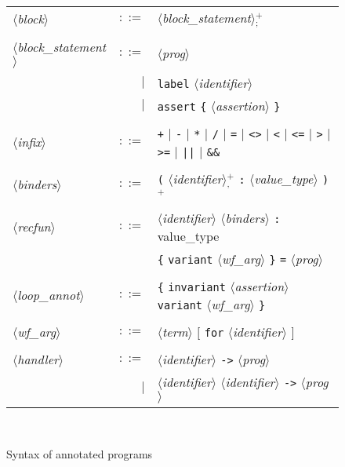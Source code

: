 \documentclass[a4paper,12pt]{report}
\newcommand{\te}[1]{\texttt{#1}}
\newcommand{\nt}[1]{$\langle$\textsl{#1}$\rangle$}
\newcommand{\plus}{$^+$}
\newcommand{\plussep}[1]{$^+_#1$}
\begin{document}
\begin{figure}[htbp]
\begin{center}
\begin{tabular}{lrl}
  \nt{block}
    & $::=$ & \nt{block\_statement}\plussep{\te{;}} \\
  \\[0.1em]

      \nt{block\_statement}
    & $::=$ & \nt{prog} \\
      & $|$ & \te{label} \nt{identifier} \\
      & $|$ & \te{assert} \te{\{} \nt{assertion} \te{\}} \\
  \\[0.1em]
 
  \nt{infix}
    & $::=$ & \te{+} $|$ \te{-} $|$ \te{*} $|$ \te{/} $|$ 
              \te{=} $|$ \te{<>} $|$ 
              \te{<} $|$ \te{<=} $|$ \te{>} $|$ \te{>=} $|$
              \te{||} $|$ \te{\&\&} \\
  \\[0.1em]

  \nt{binders}
    & $::=$ & \te{(} \nt{identifier}\plussep{\te{,}} \te{:}
              \nt{value\_type} \te{)}\plus \\
  \\[0.1em]

  \nt{recfun}
    & $::=$ & \nt{identifier} \nt{binders} \te{:}
              value\_type \\
      &     & \te{\{} \te{variant} \nt{wf\_arg} \te{\}}
              \te{=} \nt{prog} \\
  \\[0.1em]

  \nt{loop\_annot}
    & $::=$ & \te{\{} \te{invariant} \nt{assertion} 
              \te{variant} \nt{wf\_arg} \te{\}} \\
  \\[0.1em]

  \nt{wf\_arg} 
    & $::=$ & \nt{term} $[$ \te{for} \nt{identifier} $]$ \\

  \\[0.1em]

  \nt{handler} 
    & $::=$ & \nt{identifier} \te{->} \nt{prog} \\
      & $|$ & \nt{identifier} \nt{identifier} \te{->} \nt{prog} \\
  
\end{tabular}\\
\hrulefill
\caption{Syntax of annotated programs}
\label{fig:caml}
\end{center}
\end{figure}
\end{document}
